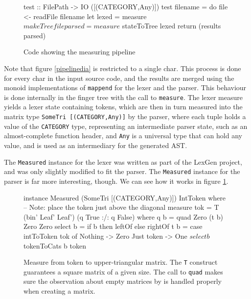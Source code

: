 \documentclass[a4paper,12pt,twosided]{report}
\begin{document}
\begin{figure}[H]
\begin{code}
test :: FilePath -> IO ([(CATEGORY,Any)])
test filename = do
    file <- readFile filename
    let lexed  = measure $ makeTree file
        parsed = measure $ stateToTree lexed
    return (results parsed)
\end{code} 
\caption{Code showing the measuring pipeline}
\end{figure}

Note that figure \ref{pipelinedia} is restricted to a single char. This process
is done for every char in the input source code, and the results are merged
using the monoid implementations of \texttt{mappend} for the lexer and the
parser. This behaviour is done internally in the finger tree with the call to
\texttt{measure}.  The lexer measure yields a lexer state containing tokens,
which are then in turn measured into the matrix type \texttt{SomeTri
[(CATEGORY,Any)]} by the parser, where each tuple holds a value of the
\texttt{CATEGORY} type, representing an intermediate parser state, such as an
almost-complete function header, and \texttt{Any} is a universal type that can
hold any value, and is used as an intermediary for the generated AST. 

The \texttt{Measured} instance for the lexer was written as part of the LexGen
project, and was only slightly modified to fit the parser. The \texttt{Measured}
instance for the parser is far more interesting, though. We can see how it works
in figure \ref{parsemeasure}.

\begin{figure}[H]
\begin{code}
instance Measured (SomeTri [(CATEGORY,Any)]) IntToken where
    -- Note: place the token just above the diagonal
    measure tok = T (bin' Leaf' Leaf') (q True :/: q False)
      where q b = quad Zero (t b) Zero Zero
            select b = if b then leftOf else rightOf
            t b = case intToToken tok of
                Nothing    -> Zero
                Just token -> One $ select b $ tokenToCats b token

\end{code}
\caption{\label{parsemeasure} Measure from token to upper-triangular matrix. The
\texttt{T} construct guarantees a square matrix of a given size. The call to
\texttt{quad} makes sure the observation about empty matrices by
\citet{parparsepaper} is handled properly when creating a matrix.}
\end{figure}
\end{document}
